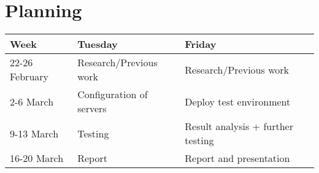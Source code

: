 \section{Planning}
\begin{center}
  \begin{tabular}{ l | l | l }
    \hline
     \textbf{Week} & \textbf{Tuesday} & \textbf{Friday} \\ \hline
     22-26 February & Research/Previous work & Research/Previous work  \\ \hline
     2-6 March & Configuration of servers & Deploy test environment  \\
    \hline
     9-13 March & Testing & Result analysis + further testing  \\ \hline
     16-20 March & Report & Report and presentation  \\ \hline
  \end{tabular}
\end{center}
